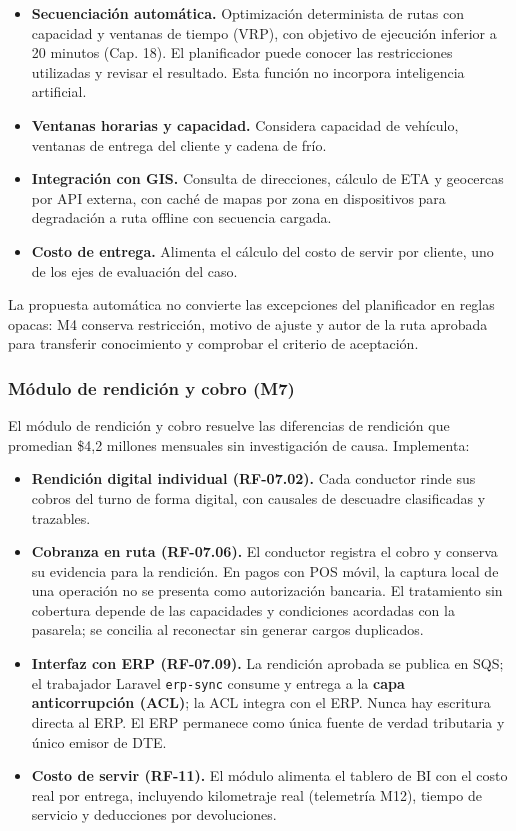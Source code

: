 \begin{itemize}
  \item \textbf{Secuenciación automática.} Optimización determinista de rutas con capacidad y ventanas de tiempo (VRP), con objetivo de ejecución inferior a 20 minutos (Cap. 18). El planificador puede conocer las restricciones utilizadas y revisar el resultado. Esta función no incorpora inteligencia artificial.
  \item \textbf{Ventanas horarias y capacidad.} Considera capacidad de vehículo, ventanas de entrega del cliente y cadena de frío.
  \item \textbf{Integración con GIS.} Consulta de direcciones, cálculo de ETA y geocercas por API externa, con caché de mapas por zona en dispositivos para degradación a ruta offline con secuencia cargada.
  \item \textbf{Costo de entrega.} Alimenta el cálculo del costo de servir por cliente, uno de los ejes de evaluación del caso.
\end{itemize}

La propuesta automática no convierte las excepciones del planificador en reglas opacas: M4 conserva restricción, motivo de ajuste y autor de la ruta aprobada para transferir conocimiento y comprobar el criterio de aceptación.

\subsubsection{Módulo de rendición y cobro (M7)}

El módulo de rendición y cobro resuelve las diferencias de rendición que promedian \$4,2 millones mensuales sin investigación de causa. Implementa:

\begin{itemize}
  \item \textbf{Rendición digital individual (RF-07.02).} Cada conductor rinde sus cobros del turno de forma digital, con causales de descuadre clasificadas y trazables.
  \item \textbf{Cobranza en ruta (RF-07.06).} El conductor registra el cobro y conserva su evidencia para la rendición. En pagos con POS móvil, la captura local de una operación no se presenta como autorización bancaria. El tratamiento sin cobertura depende de las capacidades y condiciones acordadas con la pasarela; se concilia al reconectar sin generar cargos duplicados.
  \item \textbf{Interfaz con ERP (RF-07.09).} La rendición aprobada se publica en SQS; el trabajador Laravel \texttt{erp-sync} consume y entrega a la \textbf{capa anticorrupción (ACL)}; la ACL integra con el ERP. Nunca hay escritura directa al ERP. El ERP permanece como única fuente de verdad tributaria y único emisor de DTE.
  \item \textbf{Costo de servir (RF-11).} El módulo alimenta el tablero de BI con el costo real por entrega, incluyendo kilometraje real (telemetría M12), tiempo de servicio y deducciones por devoluciones.
\end{itemize}

